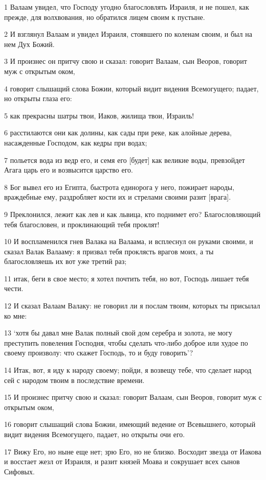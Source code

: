 \par 1 Валаам увидел, что Господу угодно благословлять Израиля, и не пошел, как прежде, для волхвования, но обратился лицем своим к пустыне.
\par 2 И взглянул Валаам и увидел Израиля, стоявшего по коленам своим, и был на нем Дух Божий.
\par 3 И произнес он притчу свою и сказал: говорит Валаам, сын Веоров, говорит муж с открытым оком,
\par 4 говорит слышащий слова Божии, который видит видения Всемогущего; падает, но открыты глаза его:
\par 5 как прекрасны шатры твои, Иаков, жилища твои, Израиль!
\par 6 расстилаются они как долины, как сады при реке, как алойные дерева, насажденные Господом, как кедры при водах;
\par 7 польется вода из ведр его, и семя его [будет] как великие воды, превзойдет Агага царь его и возвысится царство его.
\par 8 Бог вывел его из Египта, быстрота единорога у него, пожирает народы, враждебные ему, раздробляет кости их и стрелами своими разит [врага].
\par 9 Преклонился, лежит как лев и как львица, кто поднимет его? Благословляющий тебя благословен, и проклинающий тебя проклят!
\par 10 И воспламенился гнев Валака на Валаама, и всплеснул он руками своими, и сказал Валак Валааму: я призвал тебя проклясть врагов моих, а ты благословляешь их вот уже третий раз;
\par 11 итак, беги в свое место; я хотел почтить тебя, но вот, Господь лишает тебя чести.
\par 12 И сказал Валаам Валаку: не говорил ли я послам твоим, которых ты присылал ко мне:
\par 13 `хотя бы давал мне Валак полный свой дом серебра и золота, не могу преступить повеления Господня, чтобы сделать что-либо доброе или худое по своему произволу: что скажет Господь, то и буду говорить'?
\par 14 Итак, вот, я иду к народу своему; пойди, я возвещу тебе, что сделает народ сей с народом твоим в последствие времени.
\par 15 И произнес притчу свою и сказал: говорит Валаам, сын Веоров, говорит муж с открытым оком,
\par 16 говорит слышащий слова Божии, имеющий ведение от Всевышнего, который видит видения Всемогущего, падает, но открыты очи его.
\par 17 Вижу Его, но ныне еще нет; зрю Его, но не близко. Восходит звезда от Иакова и восстает жезл от Израиля, и разит князей Моава и сокрушает всех сынов Сифовых.
